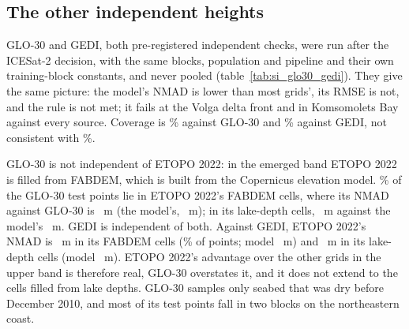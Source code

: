 \subsection*{The other independent heights}
GLO-30 and GEDI, both pre-registered independent checks, were run after the ICESat-2 decision, with the same blocks, population and pipeline and their own training-block constants, and never pooled (table~\ref{tab:si_glo30_gedi}). They give the same picture: the model's NMAD is lower than most grids', its RMSE is not, and the rule is not met; it fails at the Volga delta front and in Komsomolets Bay against every source. Coverage is \% against GLO-30 and \% against GEDI, not consistent with \%.

GLO-30 is not independent of ETOPO 2022: in the emerged band ETOPO 2022 is filled from FABDEM, which is built from the Copernicus elevation model. \% of the GLO-30 test points lie in ETOPO 2022's FABDEM cells, where its NMAD against GLO-30 is ~m (the model's, ~m); in its lake-depth cells, ~m against the model's ~m. GEDI is independent of both. Against GEDI, ETOPO 2022's NMAD is ~m in its FABDEM cells (\% of points; model ~m) and ~m in its lake-depth cells (model ~m). ETOPO 2022's advantage over the other grids in the upper band is therefore real, GLO-30 overstates it, and it does not extend to the cells filled from lake depths. GLO-30 samples only seabed that was dry before December 2010, and most of its test points fall in two blocks on the northeastern coast.


